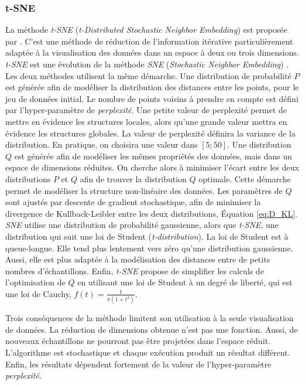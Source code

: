 \subsubsection{t-SNE} \label{subsubsec:tsne}
La méthode \textit{t-SNE} (\textit{t-Distributed Stochastic Neighbor Embedding}) est proposée par \citeauthor{maaten_visualizing_2008} \cite{maaten_visualizing_2008}. C'est une méthode de réduction de l'information itérative particulièrement adaptée à la visualisation des données dans un espace à deux ou trois dimensions.
\textit{t-SNE} est une évolution de la méthode \textit{SNE} (\textit{Stochastic Neighbor Embedding}) \cite{hinton_stochastic_2003}.
Les deux méthodes utilisent la même démarche.
Une distribution de probabilité $P$ est générée afin de modéliser la distribution des distances entre les points, pour le jeu de données initial.
Le nombre de points voisins à prendre en compte est défini par l'hyper-paramètre de \textit{perplexité}.
Une petite valeur de perplexité permet de mettre en évidence les structures locales, alors qu'une grande valeur mettra en évidence les structures globales.
La valeur de perplexité définira la variance de la distribution.
En pratique, on choisira une valeur dans $[5; 50]$.
Une distribution $Q$ est générée afin de modéliser les mêmes propriétés des données, mais dans un espace de dimensions réduites.
On cherche alors à minimiser l'écart entre les deux distributions $P$ et $Q$ afin de trouver la distribution $Q$ optimale.
Cette démarche permet de modéliser la structure non-linéaire des données.
Les paramètres de $Q$ sont ajustés par descente de gradient stochastique, afin de minimiser la divergence de Kullback-Leibler entre les deux distributions, Équation \ref{eq:D_KL}.
\textit{SNE} utilise une distribution de probabilité gaussienne, alors que \textit{t-SNE}, une distribution qui suit une loi de Student (\textit{t-distribution}).
La loi de Student est à queue-longue.
Elle tend plus lentement vers zéro qu'une distribution gaussienne.
Aussi, elle est plus adaptée à la modélisation des distances entre de petits nombres d'échantillons.
Enfin, \textit{t-SNE} propose de simplifier les calculs de l'optimisation de $Q$ en utilisant une loi de Student à un degré de liberté, qui est une loi de Cauchy, $f(t)=\frac{1}{\pi(1+t^2)}$.

Trois conséquences de la méthode limitent son utilisation à la seule visualisation de données.
La réduction de dimensions obtenue n'est pas une fonction.
Aussi, de nouveaux échantillons ne pourront pas être projetées dans l'espace réduit.
L'algorithme est stochastique et chaque exécution produit un résultat différent.
Enfin, les résultats dépendent fortement de la valeur de l'hyper-paramètre \textit{perplexité}.

